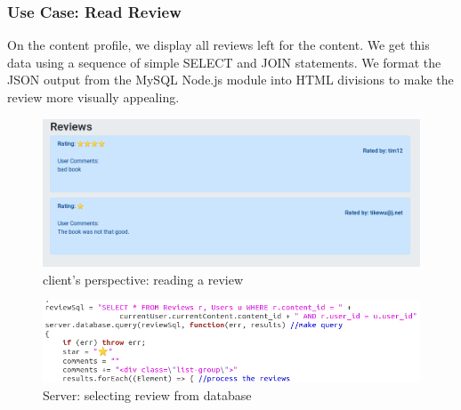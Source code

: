 \documentclass[letter, 12pt, titlepage]{article}
\begin{document}
\newpage


\subsubsection{Use Case: Read Review}
	On the content profile, we display all reviews left for the content. We get this data using a sequence of simple SELECT and JOIN statements. We format the JSON output from the MySQL Node.js module into HTML divisions to make the review more visually appealing.
	\begin{figure}[h!]
		\centering
		\includegraphics[scale=0.45]{read-review.png}
		\caption{client's perspective: reading a review}
	\end{figure}

	\begin{figure}[h!]
		\centering
		\includegraphics[scale=0.67]{read-review-code.png}
		\caption{Server: selecting review from database}
	\end{figure}

\newpage
\end{document}
